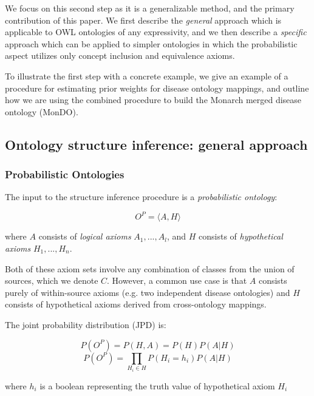\documentclass{my}
\newcommand{\eqnlabel}[1]{\label{eqn:#1}}
\begin{document}
We focus on this second step as it is a generalizable method, and the
primary contribution of this paper. We first describe the
\emph{general} approach which is applicable to OWL ontologies of any
expressivity, and we then describe a \emph{specific} approach which
can be applied to simpler ontologies in which the probabilistic aspect
utilizes only concept inclusion and equivalence axioms.

To illustrate the first step with a concrete example, we give an
example of a procedure for estimating prior weights for disease
ontology mappings, and outline how we are using the combined procedure
to build the Monarch merged disease ontology (MonDO).

\subsection{Ontology structure inference: general approach}

\subsubsection{Probabilistic Ontologies}

The input to the structure inference procedure is a \emph{probabilistic ontology}:

\begin{equation}
O^P = \langle A,H \rangle
\end{equation}

where $A$ consists of \emph{logical axioms} $A_1,...,A_l$, and $H$ consists of \emph{hypothetical axioms}
$H_1,...,H_n$.

Both of these axiom sets involve any combination of
classes from the union of sources, which we denote $C$. However, a
common use case is that $A$ consists purely of within-source
axioms (e.g. two independent disease ontologies) and $H$ consists of
hypothetical axioms derived from cross-ontology mappings.

The joint probability distribution (JPD) is:

\begin{equation}
P(O^P) = P(H,A) = P(H)P(A|H)
\end{equation}
\begin{equation}
P(O^P) = \prod_{H_i \in H}P(H_i = h_i)P(A|H)
\eqnlabel{JointLikelihood}
\end{equation}

where $h_i$ is a boolean representing the truth value of hypothetical axiom $H_i$
\end{document}
